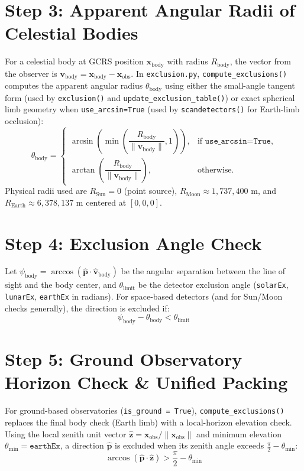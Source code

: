 \documentclass[11pt,a4paper]{article}
\begin{document}
\section{Step 3: Apparent Angular Radii of Celestial Bodies}
For a celestial body at GCRS position $\mathbf{x}_{\text{body}}$ with radius $R_{\text{body}}$,
the vector from the observer is
$\mathbf{v}_{\text{body}} = \mathbf{x}_{\text{body}} - \mathbf{x}_{\text{obs}}$.
In \texttt{exclusion.py}, \texttt{compute\_exclusions()} computes the apparent angular radius
$\theta_{\text{body}}$ using either the small-angle tangent form (used by \texttt{exclusion()}
and \texttt{update\_exclusion\_table()}) or exact spherical limb geometry when
\texttt{use\_arcsin=True} (used by \texttt{scandetectors()} for Earth-limb occlusion):
\begin{equation}
    \theta_{\text{body}} =
    \begin{cases}
        \arcsin\!\left(\min\!\left(\dfrac{R_{\text{body}}}{\|\mathbf{v}_{\text{body}}\|},
        1\right)\right), & \text{if } \texttt{use\_arcsin=True}, \\[1em]
        \arctan\!\left(\dfrac{R_{\text{body}}}{\|\mathbf{v}_{\text{body}}\|}\right),
        & \text{otherwise.}
    \end{cases}
\end{equation}
Physical radii used are $R_{\text{Sun}} = 0$ (point source),
$R_{\text{Moon}} \approx 1{,}737{,}400\text{ m}$, and
$R_{\text{Earth}} \approx 6{,}378{,}137\text{ m}$ centered at $[0,0,0]$.

\section{Step 4: Exclusion Angle Check}
Let $\psi_{\text{body}} = \arccos(\hat{\mathbf{p}} \cdot \hat{\mathbf{v}}_{\text{body}})$ be
the angular separation between the line of sight and the body center, and $\theta_{\text{limit}}$
be the detector exclusion angle (\texttt{solarEx}, \texttt{lunarEx}, \texttt{earthEx} in radians).
For space-based detectors (and for Sun/Moon checks generally), the direction is excluded if:
\begin{equation}
    \psi_{\text{body}} - \theta_{\text{body}} < \theta_{\text{limit}}
\end{equation}

\section{Step 5: Ground Observatory Horizon Check \& Unified Packing}
For ground-based observatories (\texttt{is\_ground = True}), \texttt{compute\_exclusions()}
replaces the final body check (Earth limb) with a local-horizon elevation check. Using the
local zenith unit vector $\hat{\mathbf{z}} = \mathbf{x}_{\text{obs}} / \|\mathbf{x}_{\text{obs}}\|$
and minimum elevation $\theta_{\text{min}} = \texttt{earthEx}$, a direction $\hat{\mathbf{p}}$ is
excluded when its zenith angle exceeds $\frac{\pi}{2} - \theta_{\text{min}}$:
\begin{equation}
    \arccos(\hat{\mathbf{p}} \cdot \hat{\mathbf{z}}) > \frac{\pi}{2} - \theta_{\text{min}}
\end{equation}
\end{document}
